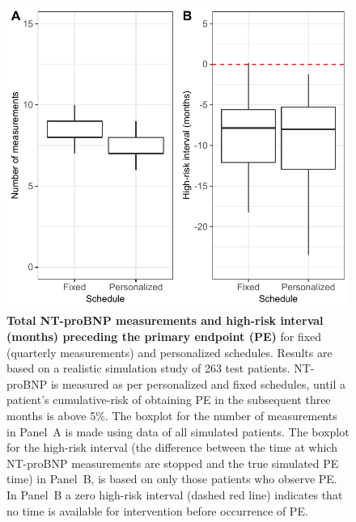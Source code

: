 \begin{subappendices}
\begin{figure}
\includegraphics{contents/c6/images/c6_fig_app1.pdf}
\caption{\textbf{Total NT-proBNP measurements and high-risk interval (months) preceding the primary endpoint (PE)} for fixed (quarterly measurements) and personalized schedules. Results are based on a realistic simulation study of 263 test patients. NT-proBNP is measured as per personalized and fixed schedules, until a patient's cumulative-risk of obtaining PE in the subsequent three months is above 5\%. The boxplot for the number of measurements in Panel~A is made using data of all simulated patients. The boxplot for the high-risk interval (the difference between the time at which NT-proBNP measurements are stopped and the true simulated PE time) in Panel~B, is based on only those patients who observe PE. In Panel~B a zero high-risk interval (dashed red line) indicates that no time is available for intervention before occurrence of PE.}
\label{c6:fig:app1}
\end{figure}


\end{subappendices}

